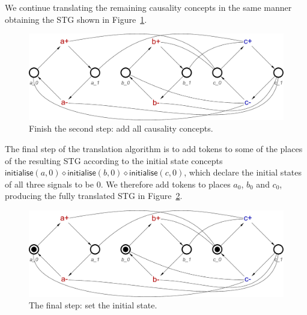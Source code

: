 \documentclass[british, journal]{IEEEtran}
\begin{document}
We continue translating the remaining causality concepts in the same manner
obtaining the STG shown in Figure~\ref{fig:step-by-step9}.

\vspace{-2mm}
\begin{figure}[h]
\begin{centering}
\includegraphics[scale=0.23]{Images/Step-by-step9}
\par
\protect\caption{\label{fig:step-by-step9}Finish the second step: add all
causality concepts.}
\vspace{-2mm}
\par\end{centering}
\end{figure}

The final step of the translation algorithm is to add tokens to some of the
places
of the resulting STG according to the initial state concepts
$\mathsf{initialise}(a,0) \diamond \mathsf{initialise}(b,0) \diamond
\mathsf{initialise}(c,0)$, which declare the initial states of all three signals
to be 0. We therefore
add tokens to places $a_0$, $b_0$ and $c_0$, producing the fully translated STG
in
Figure~\ref{fig:step-by-step12}.

\begin{figure}[h]
\begin{centering}
\includegraphics[scale=0.23]{Images/Step-by-step12}
\par
\protect\caption{\label{fig:step-by-step12}The final step: set the initial
state.}
\par\end{centering}
\vspace{-3mm}
\end{figure}
\end{document}
